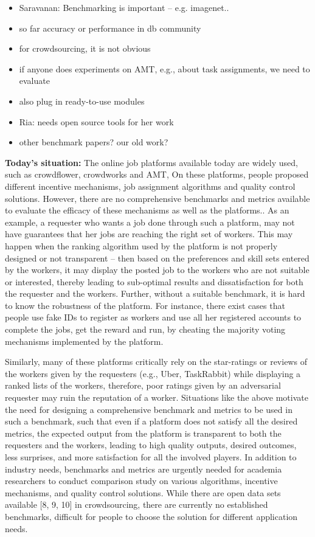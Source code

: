 \begin{itemize}
    \item Saravanan: Benchmarking is important -- e.g. imagenet..
    \item so far accuracy or performance in db community
    \item for crowdsourcing, it is not obvious
    \item if anyone does experiments on AMT, e.g., about task assignments, we need to evaluate
    \item also plug in ready-to-use modules
    \item Ria:  needs open source tools for her work
    \item other benchmark papers? our old work?
\end{itemize}

\textbf{Today’s situation: }
The online job platforms available today are widely used, such as crowdflower, crowdworks and AMT, On these platforms, people proposed different incentive mechanisms, job assignment algorithms and quality control solutions. However, there are no comprehensive benchmarks and metrics available to evaluate the efficacy of these mechanisms as well as the platforms.. As an example, a requester who wants a job done through such a platform, may not have guarantees that her jobs are reaching the right set of workers. This may happen when the ranking algorithm used by the platform is not properly designed or not transparent -- then based on the preferences and skill sets entered by the workers, it may display the posted job to the workers who are not suitable or interested, thereby leading to sub-optimal results and dissatisfaction for both the requester and the workers.  Further, without a suitable benchmark, it is hard to know the robustness of the platform. For instance, there exist cases that people use fake IDs to register as workers and use all her registered accounts to complete the jobs, get the reward and run, by cheating the majority voting mechanisms implemented by the platform.

Similarly, many of these platforms critically rely on the star-ratings or reviews of the workers given by the requesters (e.g., Uber, TaskRabbit) while displaying a ranked lists of the workers, therefore, poor ratings given by an  adversarial  requester may ruin the reputation of a worker. Situations like the above motivate the need for designing a comprehensive benchmark and metrics to be used in such a benchmark, such that even if a platform does not satisfy all the desired metrics, the expected output from the platform is transparent to both the requesters and the workers, leading to high quality outputs, desired outcomes, less surprises, and more satisfaction for all the involved players. In addition to industry needs, benchmarks and metrics are urgently needed for academia researchers to conduct comparison study on various algorithms, incentive mechanisms, and quality control solutions. While there are open data sets available [8, 9, 10] in crowdsourcing, there are currently no established benchmarks, difficult for people to choose the solution for different application needs.



